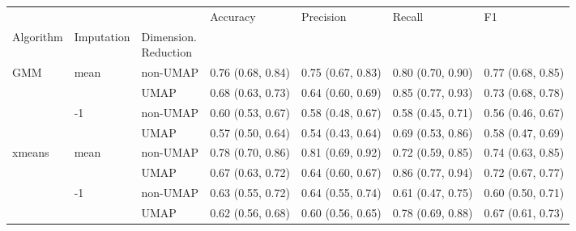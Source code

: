 \begin{tabular}{lllllll}
\toprule
       &    &      &           Accuracy &          Precision &             Recall &                 F1 \\
Algorithm & Imputation & \thead{Dimension. \\Reduction} &                    &                    &                    &                    \\
\midrule
GMM & mean & non-UMAP &  0.76 (0.68, 0.84) &  0.75 (0.67, 0.83) &  0.80 (0.70, 0.90) &  0.77 (0.68, 0.85) \\
       &    & UMAP &  0.68 (0.63, 0.73) &  0.64 (0.60, 0.69) &  0.85 (0.77, 0.93) &  0.73 (0.68, 0.78) \\
       & -1 & non-UMAP &  0.60 (0.53, 0.67) &  0.58 (0.48, 0.67) &  0.58 (0.45, 0.71) &  0.56 (0.46, 0.67) \\
       &    & UMAP &  0.57 (0.50, 0.64) &  0.54 (0.43, 0.64) &  0.69 (0.53, 0.86) &  0.58 (0.47, 0.69) \\
xmeans & mean & non-UMAP &  0.78 (0.70, 0.86) &  0.81 (0.69, 0.92) &  0.72 (0.59, 0.85) &  0.74 (0.63, 0.85) \\
       &    & UMAP &  0.67 (0.63, 0.72) &  0.64 (0.60, 0.67) &  0.86 (0.77, 0.94) &  0.72 (0.67, 0.77) \\
       & -1 & non-UMAP &  0.63 (0.55, 0.72) &  0.64 (0.55, 0.74) &  0.61 (0.47, 0.75) &  0.60 (0.50, 0.71) \\
       &    & UMAP &  0.62 (0.56, 0.68) &  0.60 (0.56, 0.65) &  0.78 (0.69, 0.88) &  0.67 (0.61, 0.73) \\
\bottomrule
\end{tabular}
